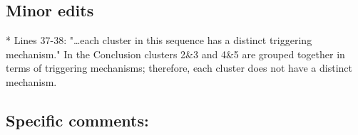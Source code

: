 \documentclass[10pt]{extarticle}
\begin{document}
\subsection*{Minor edits}

\begin{ReviewerComment}{2}
\noindent 
*        Lines 37-38: "…each cluster in this sequence has a distinct triggering mechanism." In the Conclusion clusters 2\&3 and 4\&5 are grouped together in terms of triggering mechanisms; therefore, each cluster does not have a distinct mechanism.  

\end{ReviewerComment}


\begin{Answer}
 \WorkInProgressRevTask
\end{Answer}
%
%



\subsection*{Specific comments:}
\end{document}
